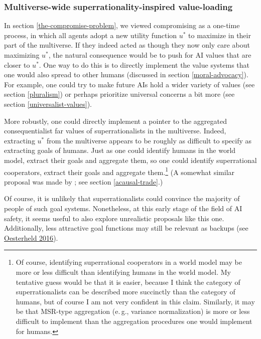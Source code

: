 \subsubsection{Multiverse-wide superrationality-inspired
value-loading}\label{multiverse-wide-superrational-cooperation-inspired-value-loading}

In section \ref{the-compromise-problem}, we viewed compromising as a one-time process, in
which all agents adopt a new utility function \(u^{*}\) to maximize in
their part of the multiverse. If they indeed acted as though they now
only care about maximizing \(u^{*}\), the natural consequence would be
to push for AI values that are closer to \(u^{*}\). One way to do this
is to directly implement the value systems that one would also spread to
other humans (discussed in section
\ref{moral-advocacy}). For
example, one could try to make future AIs hold a wider variety of values
(see section \ref{pluralism}) or
perhaps prioritize universal concerns a bit more (see section
\ref{universalist-values}).

More robustly, one could directly implement a pointer to the aggregated
consequentialist far values of superrationalists in the multiverse.
Indeed, extracting \(u^{*}\) from the multiverse appears to be roughly
as difficult to specify as extracting goals of humans. Just as one could
identify humans in the world model, extract their goals and aggregate
them, so one could identify superrational cooperators, extract their
goals and aggregate them.\footnote{Of course, identifying superrational
  cooperators in a world model may be more or less difficult than
  identifying humans in the world model. My tentative guess would be
  that it is easier, because I think the category of superrationalists
  can be described more succinctly than the category of humans, but of
  course I am not very confident in this claim. Similarly, it may be
  that MSR-type aggregation (e.\,g., variance normalization) is more or
  less difficult to implement than the aggregation procedures one would
  implement for humans.} (A somewhat similar proposal was made by 
  \citet[page 14]{Bostrom2014-gy}; see section
\ref{acausal-trade}.)

Of course, it is unlikely that superrationalists could convince the
majority of people of such goal systems. Nonetheless, at this early
stage of the field of AI safety, it seems useful to also explore
unrealistic proposals like this one. Additionally, less attractive goal
functions may still be relevant as backups (see
\href{https://foundational-research.org/files/backup-utility-functions.pdf}{Oesterheld
2016}).

